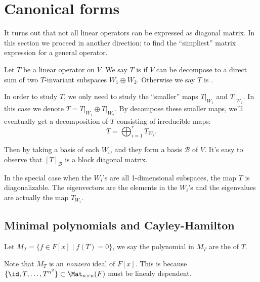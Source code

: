 \section{Canonical forms}
\label{sec:Canonical forms}

It turns out that not all linear operators can be expressed
as diagonal matrix. In this section we proceed in another
direction: to find the ``simpliest'' matrix expression for a
general operator.

\begin{definition}
	Let $T$ be a linear operator on  $V$.
	We say  $T$ is  if $V$ can be decompose to
	a direct sum of two $T$-invariant subspaces $W_1\oplus W_2$.
	Otherwise we say $T$ is .
\end{definition}

In order to study $T$, we only need to study the ``smaller'' maps $T\big|_{W_1}$
and $T\big|_{W_2}$. In this case we denote $T = T\big|_{W_1}\oplus T\big|_{W_2}$.
By decompose these smaller maps, we'll eventually
get a decomposition of $T$ consisting of irreducible maps:
\[
T = \bigoplus_{i=1}^r T_{W_i}.
\]

Then by taking a basis of each $W_i$, and they form a basis $\mathcal{B}$ of $V$.
It's easy to observe that  $[T]_{\mathcal{B}}$ is a block diagonal matrix.

In the special case when the $W_i$'s are all 1-dimensional subspaces,
the map $T$ is diagonalizable. The eigenvectors are the elements in the
$W_i$'s and the eigenvalues are actually the map $T_{W_i}$.

\subsection{Minimal polynomials and Cayley-Hamilton}
\label{sub:Minimal polynomials and Cayley-Hamilton}

\begin{definition}
	Let $M_T = \{f\in F[x]\mid f(T) = 0\}$, we say the polynomial in
	$M_T$ are the  of $T$.

	Note that $M_T$ is an \textit{nonzero} ideal of $F[x]$.
	This is because $\{\id, T, \dots, T^{n^2}\}\subset \Mat_{n \times n}(F)$
	must be linealy dependent.
\end{definition}
